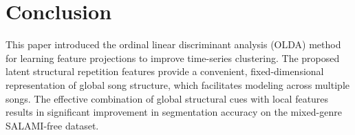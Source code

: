 \documentclass{article}
\begin{document}
\section{Conclusion}
\label{sec:conclusion}
This paper introduced the ordinal linear discriminant analysis (OLDA) method for learning feature projections to improve time-series clustering.
The proposed latent structural repetition features provide a convenient, fixed-dimensional representation of global song structure, which 
facilitates modeling across multiple songs.
The effective combination of global structural cues with local features results in significant improvement in segmentation accuracy 
on the mixed-genre SALAMI-free dataset.



\end{document}
